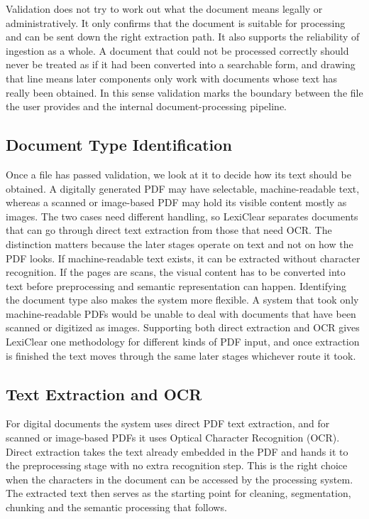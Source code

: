 \documentclass[12pt,a4paper,oneside]{report}
\begin{document}
Validation does not try to work out what the document means legally or administratively. It only confirms that the document is suitable for processing and can be sent down the right extraction path. It also supports the reliability of ingestion as a whole. A document that could not be processed correctly should never be treated as if it had been converted into a searchable form, and drawing that line means later components only work with documents whose text has really been obtained. In this sense validation marks the boundary between the file the user provides and the internal document-processing pipeline.

\subsection{Document Type Identification}

Once a file has passed validation, we look at it to decide how its text should be obtained. A digitally generated PDF may have selectable, machine-readable text, whereas a scanned or image-based PDF may hold its visible content mostly as images. The two cases need different handling, so LexiClear separates documents that can go through direct text extraction from those that need OCR. The distinction matters because the later stages operate on text and not on how the PDF looks. If machine-readable text exists, it can be extracted without character recognition. If the pages are scans, the visual content has to be converted into text before preprocessing and semantic representation can happen. Identifying the document type also makes the system more flexible. A system that took only machine-readable PDFs would be unable to deal with documents that have been scanned or digitized as images. Supporting both direct extraction and OCR gives LexiClear one methodology for different kinds of PDF input, and once extraction is finished the text moves through the same later stages whichever route it took.

\subsection{Text Extraction and OCR}

For digital documents the system uses direct PDF text extraction, and for scanned or image-based PDFs it uses Optical Character Recognition (OCR). Direct extraction takes the text already embedded in the PDF and hands it to the preprocessing stage with no extra recognition step. This is the right choice when the characters in the document can be accessed by the processing system. The extracted text then serves as the starting point for cleaning, segmentation, chunking and the semantic processing that follows.
\end{document}
